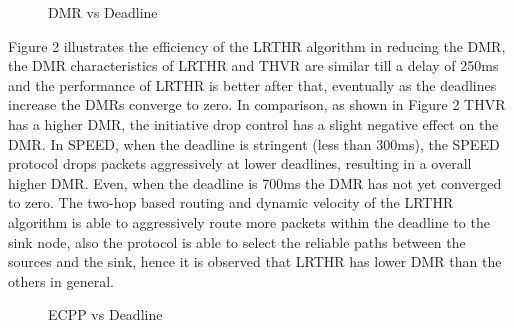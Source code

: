 \documentclass[fleqn,twoside]{article}
\begin{document}
\begin{figure}
\begin{center}
\begin{small}
\caption{DMR vs Deadline}
\end{small}
\end{center}
\end{figure}
\vskip 2mm
Figure 2 illustrates the efficiency of the LRTHR algorithm in reducing the DMR, the DMR characteristics of LRTHR and THVR are similar till a delay of 250ms and the performance of LRTHR is better after that, eventually as the deadlines increase the DMRs converge to zero. 
In comparison, as shown in Figure 2 THVR has a higher DMR, the initiative drop control has a slight negative effect on the DMR. 
\vskip 2mm
In SPEED, when the deadline is stringent (less than 300ms), the SPEED protocol drops packets aggressively at lower deadlines, resulting in a overall higher DMR. Even, when the deadline is 700ms the DMR has not yet converged to zero. The two-hop based routing and dynamic velocity of the LRTHR algorithm is able to aggressively route more packets within the deadline to the sink node, also the protocol is able to select the reliable paths between the sources and the sink, hence it is observed that 
LRTHR has lower DMR than the others in general.

\begin{figure}
\begin{center}
\begin{small}
\caption{ECPP vs Deadline}
\end{small}
\end{center}
\end{figure}
\vskip 2mm
\end{document}
